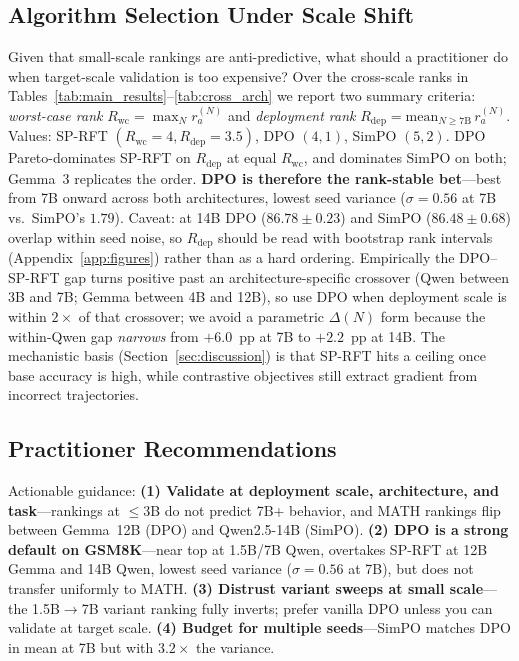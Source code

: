 \documentclass{article}
\newcommand{\sprft}{SP-RFT}
\begin{document}
\subsection{Algorithm Selection Under Scale Shift}
\label{sec:scale_shift}

Given that small-scale rankings are anti-predictive, what should a practitioner do when target-scale validation is too expensive? Over the cross-scale ranks in Tables~\ref{tab:main_results}--\ref{tab:cross_arch} we report two summary criteria: \emph{worst-case rank} $R_\mathrm{wc} {=} \max_N r_a^{(N)}$ and \emph{deployment rank} $R_\mathrm{dep} {=} \mathrm{mean}_{N \geq 7\text{B}}\, r_a^{(N)}$. Values: \sprft{} $(R_\mathrm{wc}{=}4, R_\mathrm{dep}{=}3.5)$, DPO $(4, 1)$, SimPO $(5, 2)$. DPO Pareto-dominates \sprft{} on $R_\mathrm{dep}$ at equal $R_\mathrm{wc}$, and dominates SimPO on both; Gemma~3 replicates the order. \textbf{DPO is therefore the rank-stable bet}---best from 7B onward across both architectures, lowest seed variance ($\sigma{=}0.56$ at 7B vs.\ SimPO's $1.79$). Caveat: at 14B DPO ($86.78{\pm}0.23$) and SimPO ($86.48{\pm}0.68$) overlap within seed noise, so $R_\mathrm{dep}$ should be read with bootstrap rank intervals (Appendix~\ref{app:figures}) rather than as a hard ordering. Empirically the DPO--\sprft{} gap turns positive past an architecture-specific crossover (Qwen between 3B and 7B; Gemma between 4B and 12B), so use DPO when deployment scale is within $2\times$ of that crossover; we avoid a parametric $\Delta(N)$ form because the within-Qwen gap \emph{narrows} from $+6.0$~pp at 7B to $+2.2$~pp at 14B. The mechanistic basis (Section~\ref{sec:discussion}) is that \sprft{} hits a ceiling once base accuracy is high, while contrastive objectives still extract gradient from incorrect trajectories.

\subsection{Practitioner Recommendations}
\label{sec:recommendations}

Actionable guidance: \textbf{(1) Validate at deployment scale, architecture, and task}---rankings at $\leq$3B do not predict 7B+ behavior, and MATH rankings flip between Gemma~12B (DPO) and Qwen2.5-14B (SimPO). \textbf{(2) DPO is a strong default on GSM8K}---near top at 1.5B/7B Qwen, overtakes \sprft{} at 12B Gemma and 14B Qwen, lowest seed variance ($\sigma{=}0.56$ at 7B), but does not transfer uniformly to MATH. \textbf{(3) Distrust variant sweeps at small scale}---the 1.5B$\to$7B variant ranking fully inverts; prefer vanilla DPO unless you can validate at target scale. \textbf{(4) Budget for multiple seeds}---SimPO matches DPO in mean at 7B but with $3.2\times$ the variance.
\end{document}

